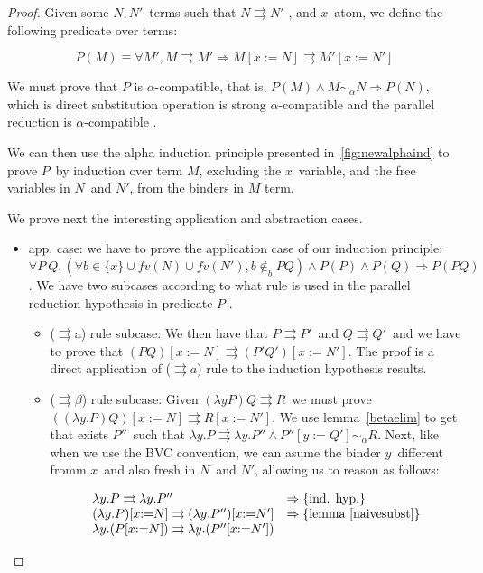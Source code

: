\documentclass[preprint,10pt]{sigplanconf}
\newcommand{\alp}{\ensuremath{\alpha}}
\newcommand{\lam}{\ensuremath{\lambda}}
\newcommand{\alpsym}{\ensuremath{\sim_\alpha}}
\newcommand{\p}{\ensuremath{\rightrightarrows}}
\newcommand{\ninb}{\ensuremath{\not\in_b}}
\begin{document}
\begin{proof}
Given some $N,N'$\ terms such that $N \p N'$ , and $x$\ atom, we define the following predicate over terms:

\[ P(M) \equiv \forall M', M \p M' \Rightarrow M [ x {:=} N ] \p M' [ x {:=} N' ] \]

We must prove that $P$ is \alp-compatible, that is,  $P(M) \wedge M \alpsym N \Rightarrow P(N)$, which is direct substitution operation is strong \alp-compatible and the parallel reduction is \alp-compatible .
  
We can then use the alpha induction principle presented in~\ref{fig:newalphaind} to prove $P$\ by induction over term $M$, excluding the $x$\ variable, and the free variables in $N$\ and $N'$, from the binders in $M$ term. 

We prove next the interesting application and abstraction cases. 

\begin{itemize}
\item app. case: we have to prove the application case of our induction principle: $\forall P\ Q, (\forall b \in \{x \} \cup fv(N) \cup fv(N'), b \ninb P Q) \wedge P(P) \wedge P(Q)  \Rightarrow P (P Q)$. We have two subcases according to what rule is used in the parallel reduction hypothesis in predicate $P$ .
  \begin{itemize}
  \item (\p a) rule subcase: We then have that $P \p P'$\ and $Q \p Q'$\ and we have to prove that $(P Q) [x {:=} N ] \p (P' Q') [x {:=} N']$. The proof is a direct application of ($\p a$) rule to the induction hypothesis results.
  \item (\p$\beta$) rule subcase: Given $(\lam y P) Q \p R$\ we must prove $((\lam y. P) Q) [x {:=} N ] \p R [x {:=} N']$. We use lemma~\ref{betaelim} to get that exists $P''$\ such that $\lam y .P \p \lam y. P'' \wedge P''[y{:=}Q'] \alpsym R$. Next, like when we use the BVC convention, we can asume the binder $y$\ different fromm $x$\ and also fresh in $N$\ and $N'$, allowing us to reason as follows:

\[
\begin{array}{ll}
  \lam y. P \p \lam y. P'' & \Rightarrow \{\text{ind. hyp.}\}\\
  (\lam y. P)[x{:=}N] \p (\lam y. P'')[x{:=}N'] & \Rightarrow \{\text{lemma~\ref{naivesubst}}\}\\
  \lam y. (P[x{:=}N]) \p \lam y . ( P''[x{:=}N'])
\end{array}
\]


\end{itemize}
\end{itemize}
\end{proof}
\end{document}
